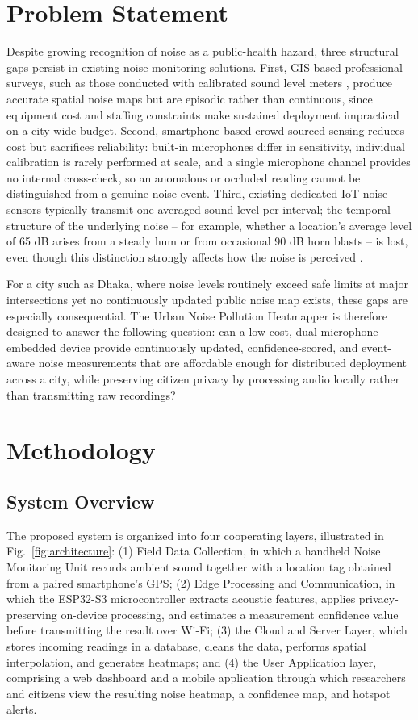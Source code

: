 \documentclass[conference]{IEEEtran}
\begin{document}
\section{Problem Statement}
Despite growing recognition of noise as a public-health hazard, three structural gaps persist in existing noise-monitoring solutions. First, GIS-based professional surveys, such as those conducted with calibrated sound level meters \cite{b2}\cite{b4}, produce accurate spatial noise maps but are episodic rather than continuous, since equipment cost and staffing constraints make sustained deployment impractical on a city-wide budget. Second, smartphone-based crowd-sourced sensing \cite{b5} reduces cost but sacrifices reliability: built-in microphones differ in sensitivity, individual calibration is rarely performed at scale, and a single microphone channel provides no internal cross-check, so an anomalous or occluded reading cannot be distinguished from a genuine noise event. Third, existing dedicated IoT noise sensors \cite{b8}\cite{b9} typically transmit one averaged sound level per interval; the temporal structure of the underlying noise -- for example, whether a location's average level of 65 dB arises from a steady hum or from occasional 90 dB horn blasts -- is lost, even though this distinction strongly affects how the noise is perceived \cite{b3}.

For a city such as Dhaka, where noise levels routinely exceed safe limits at major intersections \cite{b4} yet no continuously updated public noise map exists, these gaps are especially consequential. The Urban Noise Pollution Heatmapper is therefore designed to answer the following question: can a low-cost, dual-microphone embedded device provide continuously updated, confidence-scored, and event-aware noise measurements that are affordable enough for distributed deployment across a city, while preserving citizen privacy by processing audio locally rather than transmitting raw recordings?

\section{Methodology}

\subsection{System Overview}
The proposed system is organized into four cooperating layers, illustrated in Fig.~\ref{fig:architecture}: (1) Field Data Collection, in which a handheld Noise Monitoring Unit records ambient sound together with a location tag obtained from a paired smartphone's GPS; (2) Edge Processing and Communication, in which the ESP32-S3 microcontroller extracts acoustic features, applies privacy-preserving on-device processing, and estimates a measurement confidence value before transmitting the result over Wi-Fi; (3) the Cloud and Server Layer, which stores incoming readings in a database, cleans the data, performs spatial interpolation, and generates heatmaps; and (4) the User Application layer, comprising a web dashboard and a mobile application through which researchers and citizens view the resulting noise heatmap, a confidence map, and hotspot alerts.
\end{document}
